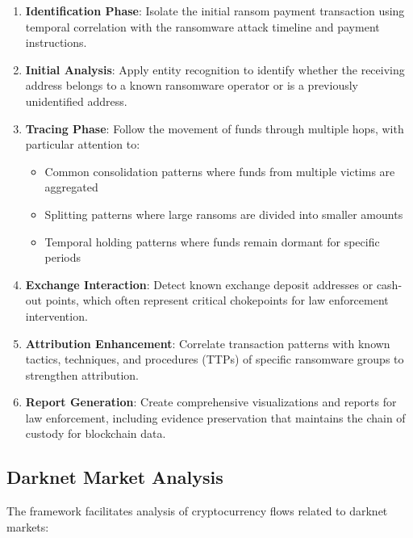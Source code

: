 \documentclass[conference]{IEEEtran}
\begin{document}
\begin{enumerate}
    \item \textbf{Identification Phase}: Isolate the initial ransom payment transaction using temporal correlation with the ransomware attack timeline and payment instructions.
    
    \item \textbf{Initial Analysis}: Apply entity recognition to identify whether the receiving address belongs to a known ransomware operator or is a previously unidentified address.
    
    \item \textbf{Tracing Phase}: Follow the movement of funds through multiple hops, with particular attention to:
    \begin{itemize}
        \item Common consolidation patterns where funds from multiple victims are aggregated
        \item Splitting patterns where large ransoms are divided into smaller amounts
        \item Temporal holding patterns where funds remain dormant for specific periods
    \end{itemize}
    
    \item \textbf{Exchange Interaction}: Detect known exchange deposit addresses or cash-out points, which often represent critical chokepoints for law enforcement intervention.
    
    \item \textbf{Attribution Enhancement}: Correlate transaction patterns with known tactics, techniques, and procedures (TTPs) of specific ransomware groups to strengthen attribution.
    
    \item \textbf{Report Generation}: Create comprehensive visualizations and reports for law enforcement, including evidence preservation that maintains the chain of custody for blockchain data.
\end{enumerate}

\subsection{Darknet Market Analysis}

The framework facilitates analysis of cryptocurrency flows related to darknet markets:
\end{document}
